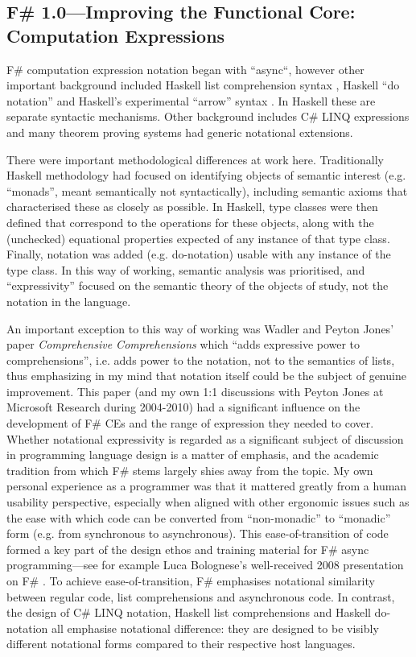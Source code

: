 \documentclass[acmsmall,screen]{acmart}
\begin{document}
\subsection*{F\# 1.0---Improving the Functional Core: Computation Expressions}

F\# computation expression notation began with ``async``, however other important background included Haskell list comprehension
syntax \citep{RefListComprehensions}, Haskell ``do notation'' \citep{RefHaskellDo} and Haskell's experimental
``arrow'' syntax \citep{RefArrows}.
In Haskell these are separate syntactic mechanisms.
Other background includes C\# LINQ expressions \citep{RefLinqDocs} and many
theorem proving systems had generic notational extensions.

There were important methodological differences at work here.  Traditionally Haskell methodology had focused on
identifying objects of semantic interest (e.g. ``monads'', meant semantically not syntactically), including
semantic axioms that characterised these as closely as possible. In Haskell, type classes were then defined that
correspond to the operations for these objects, along with the (unchecked) equational properties
expected of any instance of that type class. Finally, notation was added (e.g. do-notation) usable with
any instance of the type class.  In this way of working, semantic analysis was prioritised, and ``expressivity'' focused on the semantic theory of the objects of study,
not the notation in the language.

An important exception to this way of working was Wadler and Peyton Jones' paper
\textit{Comprehensive Comprehensions} \citep{ComprehensiveCOmprehensions} which
``adds expressive power to comprehensions'', i.e. adds power to the notation, not to the semantics of lists, thus emphasizing in my mind that
notation itself could be the subject of genuine improvement.
This paper (and my own 1:1 discussions with Peyton Jones at Microsoft Research during 2004-2010) had a significant influence on the
development of F\# CEs and the range of expression they needed to cover. Whether notational expressivity is regarded as
a significant subject of discussion in programming language design is a matter of emphasis, and the academic
tradition from which F\# stems largely shies away from the topic.
My own personal experience as a programmer was that it mattered greatly from a human usability perspective, especially
when aligned with other ergonomic issues such as the ease with which code can be converted from ``non-monadic'' to ``monadic''
form (e.g. from synchronous to asynchronous). This ease-of-transition of code formed a key part
of the design ethos and training material for F\# async programming---see for example Luca Bolognese's
well-received 2008 presentation on F\# \citep{RefMSDNLuca}.  To achieve ease-of-transition, F\# emphasises
notational similarity between regular code, list comprehensions and asynchronous code.
In contrast, the design of C\# LINQ notation, Haskell list comprehensions and Haskell do-notation all emphasise notational difference:
they are designed to be visibly different notational forms compared to their respective host languages. 
\end{document}
